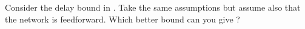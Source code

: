 \begin{problem}
Consider the delay bound in . Take the same
assumptions but assume also that the network is feedforward. Which
better bound can you give ?
\end{problem}
